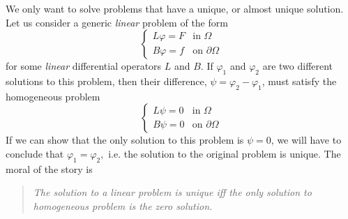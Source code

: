 We only want to solve problems that have a unique, or almost unique solution. Let us consider a generic \textit{linear} problem of the form
\[
    \begin{cases}
        L \varphi=F & \text {in } \Omega \\
        B \varphi=f & \text {on } \partial \Omega
    \end{cases} 
\]
for some \textit{linear} differential operators $L$ and $B$. If $\varphi_{1}$ and $\varphi_{2}$ are two different solutions to this problem, then their difference, $\psi=\varphi_{2}-\varphi_{1}$, must satisfy the homogeneous problem
\[
    \begin{cases}
        L \psi=0 & \text {in } \Omega \\
        B \psi=0 & \text {on } \partial \Omega
    \end{cases} 
\]
If we can show that the only solution to this problem is $\psi=0$, we will have to conclude that $\varphi_{1}=\varphi_{2},$ i.e. the solution to the original problem is unique. The moral of the story is 
\begin{quote}
    \textit{The solution to a linear problem is unique iff the only
    solution to homogeneous problem is the zero solution.}
\end{quote}

